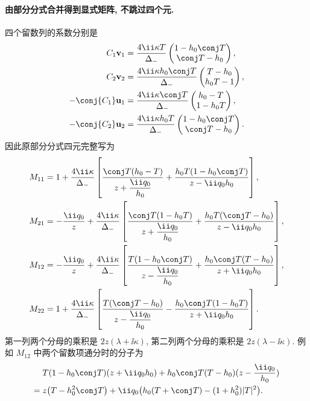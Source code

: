 \paragraph{由部分分式合并得到显式矩阵, 不跳过四个元.}
四个留数列的系数分别是
\[
\begin{aligned}
C_1\mathbf v_1
&=\dfrac{4\ii\kappa T}{\Delta_-}
\begin{pmatrix}1-h_0\conj T\\\conj T-h_0\end{pmatrix},\\
C_2\mathbf v_2
&=\dfrac{4\ii\kappa h_0\conj T}{\Delta_-}
\begin{pmatrix}T-h_0\\h_0T-1\end{pmatrix},\\
-\conj{C_1}\mathbf u_1
&=\dfrac{4\ii\kappa\conj T}{\Delta_-}
\begin{pmatrix}h_0-T\\1-h_0T\end{pmatrix},\\
-\conj{C_2}\mathbf u_2
&=\dfrac{4\ii\kappa h_0T}{\Delta_-}
\begin{pmatrix}1-h_0\conj T\\\conj T-h_0\end{pmatrix}.
\end{aligned}
\]
因此原部分分式四元完整写为
\[
\begin{aligned}
M_{11}
&=1+\dfrac{4\ii\kappa}{\Delta_-}
\left[
\dfrac{\conj T(h_0-T)}{z+\dfrac{\ii q_0}{h_0}}
+\dfrac{h_0T(1-h_0\conj T)}{z-\ii q_0h_0}
\right],\\
M_{21}
&=-\dfrac{\ii q_0}{z}
+\dfrac{4\ii\kappa}{\Delta_-}
\left[
\dfrac{\conj T(1-h_0T)}{z+\dfrac{\ii q_0}{h_0}}
+\dfrac{h_0T(\conj T-h_0)}{z-\ii q_0h_0}
\right],\\
M_{12}
&=-\dfrac{\ii q_0}{z}
+\dfrac{4\ii\kappa}{\Delta_-}
\left[
\dfrac{T(1-h_0\conj T)}{z-\dfrac{\ii q_0}{h_0}}
+\dfrac{h_0\conj T(T-h_0)}{z+\ii q_0h_0}
\right],\\
M_{22}
&=1+\dfrac{4\ii\kappa}{\Delta_-}
\left[
\dfrac{T(\conj T-h_0)}{z-\dfrac{\ii q_0}{h_0}}
-\dfrac{h_0\conj T(1-h_0T)}{z+\ii q_0h_0}
\right].
\end{aligned}
\]
第一列两个分母的乘积是 $2z(\lambda+\ii\kappa)$,
第二列两个分母的乘积是 $2z(\lambda-\ii\kappa)$.
例如 $M_{12}$ 中两个留数项通分时的分子为
\[
\begin{aligned}
&T(1-h_0\conj T)(z+\ii q_0h_0)
+h_0\conj T(T-h_0)(z-\dfrac{\ii q_0}{h_0})\\
={}&z\bigl(T-h_0^2\conj T\bigr)
+\ii q_0\bigl(h_0(T+\conj T)-(1+h_0^2)|T|^2\bigr).
\end{aligned}
\]
